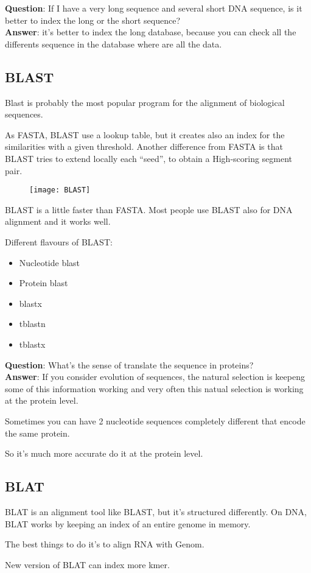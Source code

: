 \textbf{Question}: If I have a very long sequence and several short DNA
sequence, is it better to index the long or the short sequence? \\
 
\textbf{Answer}: it's better to index the long database, because you can
check all the differents sequence in the database where are all the data.

\subsection{BLAST}

Blast is probably the most popular program for the alignment of biological
sequences.

As FASTA, BLAST use a lookup table, but it creates also an index for the
similarities with a given threshold. Another difference from FASTA is that
BLAST tries to extend locally each ``seed'', to obtain a High-scoring segment
pair.

\begin{figure}[H]
  \centering
  \texttt{[image: BLAST]}
  \label{fig:blast}
\end{figure}

BLAST is a little faster than FASTA. Most people use BLAST also for DNA
alignment and it works well.

Different flavours of BLAST:
\begin{itemize}
  \item Nucleotide blast
  \item Protein blast
  \item blastx
  \item tblastn
  \item tblastx
\end{itemize}

\textbf{Question}: What's the sense of translate the sequence in proteins? \\

\textbf{Answer}: If you consider evolution of sequences, the natural selection
is keepeng some of this information working and very often this natual
selection is working at the protein level. 

Sometimes you can have 2 nucleotide sequences completely different that
encode the same protein. 

So it's much more accurate do it at the protein level.

\subsection{BLAT}

BLAT is an alignment tool like BLAST, but it's structured differently. On DNA,
BLAT works by keeping an index of an entire genome in memory.

The best things to do it's to align RNA with Genom.

New version of BLAT can index more kmer.
